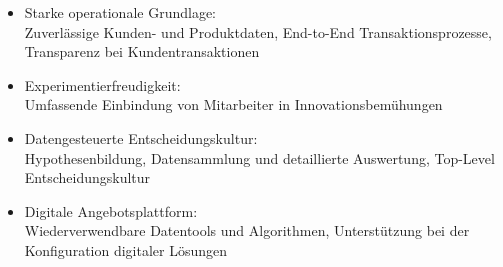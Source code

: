 \documentclass[a4]{scrartcl}
\begin{document}
\begin{itemize}
\item Starke operationale Grundlage: \\
Zuverlässige Kunden- und Produktdaten, End-to-End Transaktionsprozesse, Transparenz bei Kundentransaktionen

\item Experimentierfreudigkeit: \\
Umfassende Einbindung von Mitarbeiter in Innovationsbemühungen

\item Datengesteuerte Entscheidungskultur: \\
Hypothesenbildung, Datensammlung und detaillierte Auswertung, Top-Level Entscheidungskultur

\item Digitale Angebotsplattform: \\
Wiederverwendbare Datentools und Algorithmen, Unterstützung bei der Konfiguration digitaler Lösungen

\end{itemize}
\end{document}
